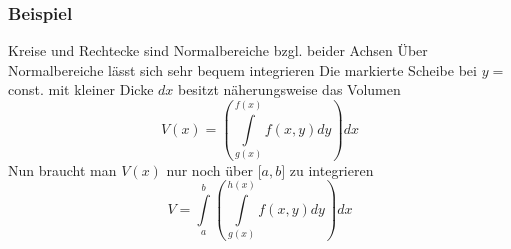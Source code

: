 \subsubsection*{Beispiel}
Kreise und Rechtecke sind Normalbereiche bzgl. beider Achsen
Über Normalbereiche lässt sich sehr bequem integrieren
Die markierte Scheibe bei $y=$const. mit kleiner Dicke $dx$ besitzt näherungsweise das Volumen
\[V(x) = \left( {\int\limits_{g(x)}^{f(x)} {f\left( {x,y} \right)dy} } \right)dx\]
Nun braucht man $V(x)$ nur noch über $\lbrack a,b\rbrack$ zu integrieren\[V = \int\limits_a^b {\left( {\int\limits_{g(x)}^{h(x)} {f\left( {x,y} \right)dy} } \right)dx} \]


